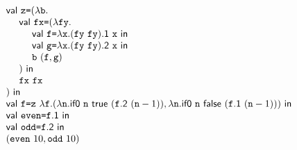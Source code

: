 $\begin{array}{@{}l@{}}
  \ebind{\cz}{(\efun{\cb}{\\
  \ \ \ \ \ebind{\code{fx}}{(\efun{\code{fy}}{\\
  \ \ \ \ \ \ \ \ \ebind{\cf}{\efun{\cx}{(\eapp{\code{fy}}{\code{fy}})\textsf{.1}\ \cx}}{\\
  \ \ \ \ \ \ \ \ \ebind{\code{g}}{\efun{\cx}{(\eapp{\code{fy}}{\code{fy}})\textsf{.2}\ \cx}}{\\
  \ \ \ \ \ \ \ \ \eapp{\cb}{(\cf,\code{g})}}}}\\\ \ \ \ )}{\\
  \ \ \ \ \eapp{\code{fx}}{\code{fx}}}}\\)}{\\
  \ebind{\cf}{\eapp{\cz}{\efun{\cf}{(
    \efun{\code{n}}{\eifz{\code{n}}{\true}{(\eapp{\cf\textsf{.2}}{(\esub{\code{n}}{1})})}},
    \efun{\code{n}}{\eifz{\code{n}}{\false}{(\eapp{\cf\textsf{.1}}{(\esub{\code{n}}{1})})}}
  )}}}{\\
  \ebind{\code{even}}{\cf\textsf{.1}}{\\
  \ebind{\code{odd}}{\cf\textsf{.2}}{\\
  (\eapp{\code{even}}{10}, \eapp{\code{odd}}{10})}}}}
\end{array}$
\\

\textbf{}

